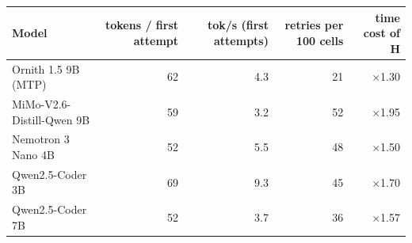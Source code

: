 \begin{tabular}{lrrrr}\toprule Model & tokens / first attempt & tok/s (first attempts) & retries per 100 cells & time cost of H\\\midrule
Ornith 1.5 9B (MTP) & 62 & 4.3 & 21 & $\times$1.30 \\
MiMo-V2.6-Distill-Qwen 9B & 59 & 3.2 & 52 & $\times$1.95 \\
Nemotron 3 Nano 4B & 52 & 5.5 & 48 & $\times$1.50 \\
Qwen2.5-Coder 3B & 69 & 9.3 & 45 & $\times$1.70 \\
Qwen2.5-Coder 7B & 52 & 3.7 & 36 & $\times$1.57 \\
\bottomrule\end{tabular}
